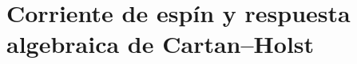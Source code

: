 %

\section{Corriente de espín y respuesta algebraica de Cartan--Holst}
\label{vii:sec:corriente-respuesta-cartan}

